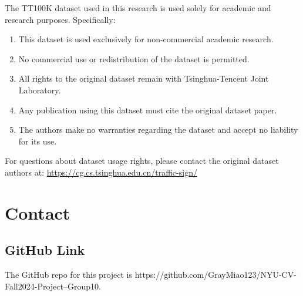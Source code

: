 \documentclass[10pt]{article}
\begin{document}
The TT100K dataset used in this research is used solely for academic and research purposes. Specifically:

\begin{enumerate}
    \item This dataset is used exclusively for non-commercial academic research.
    \item No commercial use or redistribution of the dataset is permitted.
    \item All rights to the original dataset remain with Tsinghua-Tencent Joint Laboratory.
    \item Any publication using this dataset must cite the original dataset paper.
    \item The authors make no warranties regarding the dataset and accept no liability for its use.
\end{enumerate}

For questions about dataset usage rights, please contact the original dataset authors at:
\href{https://cg.cs.tsinghua.edu.cn/traffic-sign/}{https://cg.cs.tsinghua.edu.cn/traffic-sign/}
\section*{Contact}
\subsection*{GitHub Link}
The GitHub repo for this project is https://github.com/GrayMiao123/NYU-CV-Fall2024-Project--Group10. 
\end{document}
